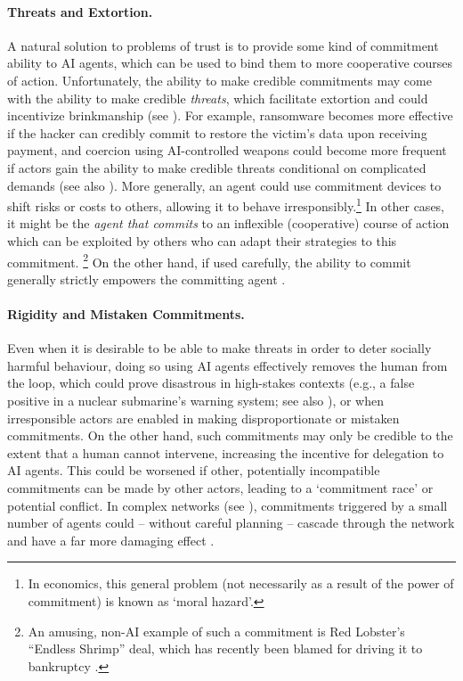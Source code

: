 \paragraph{Threats and Extortion.}
A natural solution to problems of trust is to provide some kind of commitment ability to AI agents, which can be used to bind them to more cooperative courses of action.
Unfortunately, the ability to make credible commitments may come with the ability to make credible \textit{threats}, which facilitate extortion and could incentivize brinkmanship (see ).
For example, ransomware becomes more effective if the hacker can credibly commit to restore the victim's data upon receiving payment, and coercion using AI-controlled weapons could become more frequent if actors gain the ability to make credible threats conditional on complicated demands (see also ).
More generally, an agent could use commitment devices to shift risks or costs to others, allowing it to behave irresponsibly.\footnote{In economics, this general problem (not necessarily as a result of the power of commitment) is known as `moral hazard'.}
In other cases, it might be the \textit{agent that commits} to an inflexible (cooperative) course of action which can be exploited by others who can adapt their strategies to this commitment.%
\footnote{An amusing, non-AI example of such a commitment is Red Lobster's ``Endless Shrimp'' deal, which has recently been blamed for driving it to bankruptcy \citep{Meyersohn2024}.}
On the other hand, if used carefully, the ability to commit generally strictly empowers the committing agent \citep{Stengel2010,Letchford2013}.

\paragraph{Rigidity and Mistaken Commitments.}
Even when it is desirable to be able to make threats in order to deter socially harmful behaviour, doing so using AI agents effectively removes the human from the loop, which could prove disastrous in high-stakes contexts (e.g., a false positive in a nuclear submarine's warning system; see also ), or when irresponsible actors are enabled in making disproportionate or mistaken commitments.
On the other hand, such commitments may only be credible to the extent that a human cannot intervene, increasing the incentive for delegation to AI agents.
This could be worsened if other, potentially incompatible commitments can be made by other actors, leading to a `commitment race' \citep{commitment_races} or potential conflict.
In complex networks (see ), commitments triggered by a small number of agents could -- without careful planning -- cascade through the network and have a far more damaging effect \citep{Xia2010}.

